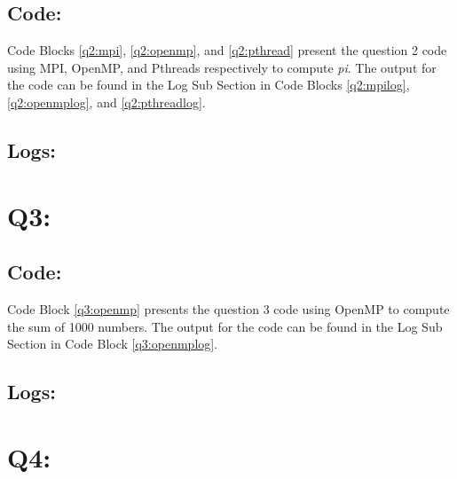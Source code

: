\documentclass[11pt]{article}
\begin{document}
\subsection*{Code:}
Code Blocks \ref{q2:mpi}, \ref{q2:openmp}, and \ref{q2:pthread} present the question 2 code using MPI, OpenMP, and Pthreads respectively to compute \textit{pi}.
The output for the code can be found in the Log Sub Section in Code Blocks \ref{q2:mpilog}, \ref{q2:openmplog}, and \ref{q2:pthreadlog}.





\subsection*{Logs:}




\section*{Q3:}
\subsection*{Code:}
Code Block \ref{q3:openmp} presents the question 3 code using OpenMP to compute the sum of 1000 numbers.
The output for the code can be found in the Log Sub Section in Code Block \ref{q3:openmplog}.



\subsection*{Logs:}


\section*{Q4:}
\end{document}

